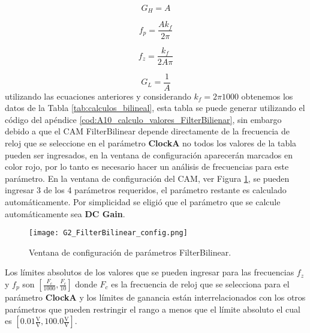 	 \begin{equation}
		 G_{H} = A
		 \label{ec:bilineal_gh}
	 \end{equation}
	 
	 \begin{equation}
	 	f_{p} = \frac{A k_{f}}{2 \pi}
	 	\label{ec:bilineal_fp}
	 \end{equation}
	 
	 \begin{equation}
		f_{z} = \frac{k_{f}}{ 2A \pi}
		\label{ec:bilineal_fz}
	 \end{equation}
	 
	 \begin{equation}
	 G_{L} = \frac{1}{A}
	 \label{ec:bilineal_gl}
	 \end{equation}
	utilizando las ecuaciones anteriores y considerando $k_{f} = 2 \pi 1000$ obtenemos los datos de la Tabla \ref{tab:calculos_bilineal}, esta tabla se puede generar utilizando el código del apéndice \ref{cod:A10_calculo_valores_FilterBilienar}, sin embargo debido a que el CAM FilterBilinear depende directamente de la frecuencia de reloj que se seleccione en el parámetro \textbf{ClockA} no todos los valores de la tabla pueden ser ingresados, en la ventana de configuración aparecerán marcados en color rojo, por lo tanto  es necesario hacer un análisis de frecuencias para este parámetro. En la ventana de configuración del CAM, ver Figura \ref{fig:G2_FilterBilinear_config.png}, se pueden ingresar 3 de los 4 parámetros requeridos, el parámetro restante es calculado automáticamente. Por simplicidad se eligió que el parámetro que se calcule automáticamente sea \textbf{DC Gain}. 
	   
\begin{figure}[!ht] 
\caption{Ventana de configuración de parámetros FilterBilinear.}
\label{fig:G2_FilterBilinear_config.png}
\centering
\texttt{[image: G2\_FilterBilinear\_config.png]}
\end{figure}

Los límites absolutos de los valores que se pueden ingresar para las frecuencias $f_{z}$ y $f_{p}$ son $[\frac{F_{c}}{1000}, \frac{F_{c}}{10}]$ donde $F_{c}$ es la frecuencia de reloj que se selecciona para el parámetro \textbf{ClockA} y los límites de ganancia están interrelacionados con los otros parámetros que pueden restringir el rango a menos que el límite absoluto el cual es $[0.01 \frac{\mathrm{V}}{\mathrm{V}}, 100.0\frac{\mathrm{V}}{\mathrm{V}}]$.  

